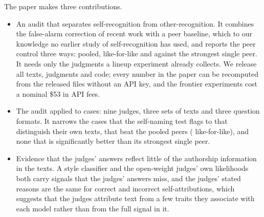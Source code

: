 The paper makes three contributions.
\begin{itemize}
\item An audit that separates self-recognition from other-recognition. It
combines the false-alarm correction of recent work with a peer baseline,
which to our knowledge no earlier study of self-recognition has used, and
reports the peer control three ways: pooled, like-for-like and against the
strongest single peer. It needs only the judgments a lineup experiment
already collects. We release all texts, judgments and code; every number in
the paper can be recomputed from the released files without an API key, and the frontier experiments
cost a nominal \$53 in API fees.
\item The audit applied to \CVcells{} cases: nine judges, three sets of texts
and three question formats. It narrows the \CVflagged{} cases that the
self-naming test flags to \CVdisc{} that distinguish their own texts,
\CVbothAttr{} that beat the pooled peers (\CXLikeForLike{} like-for-like), and
none that is significantly better than its strongest single peer.
\item Evidence that the judges' answers reflect little of the authorship
information in the texts. A style classifier and the open-weight judges' own
likelihoods both carry signals that the judges' answers miss, and
the judges' stated reasons are the same for correct and incorrect
self-attributions, which suggests that the judges attribute text from a few
traits they associate with each model rather than from the full signal in it.
\end{itemize}
